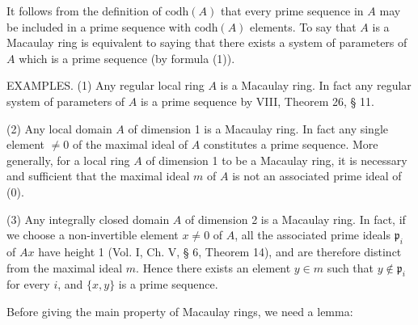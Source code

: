 It follows from the definition of $\text{codh}(A)$ that every prime sequence in $A$ may be included in a prime sequence with $\text{codh}(A)$ elements. To say that $A$ is a Macaulay ring is equivalent to saying that there exists a system of parameters of $A$ which is a prime sequence (by formula (1)).

EXAMPLES. (1) Any regular local ring $A$ is a Macaulay ring. In fact any regular system of parameters of $A$ is a prime sequence by VIII, Theorem 26, § 11.

(2) Any local domain $A$ of dimension 1 is a Macaulay ring. In fact any single element $\neq 0$ of the maximal ideal of $A$ constitutes a prime sequence. More generally, for a local ring $A$ of dimension 1 to be a Macaulay ring, it is necessary and sufficient that the maximal ideal $m$ of $A$ is not an associated prime ideal of (0).

(3) Any integrally closed domain $A$ of dimension 2 is a Macaulay ring. In fact, if we choose a non-invertible element $x \neq 0$ of $A$, all the associated prime ideals $\mathfrak{p}_i$ of $Ax$ have height 1 (Vol. I, Ch. V, § 6, Theorem 14), and are therefore distinct from the maximal ideal $m$. Hence there exists an element $y \in m$ such that $y \notin \mathfrak{p}_i$ for every $i$, and $\{x, y\}$ is a prime sequence.

Before giving the main property of Macaulay rings, we need a lemma: